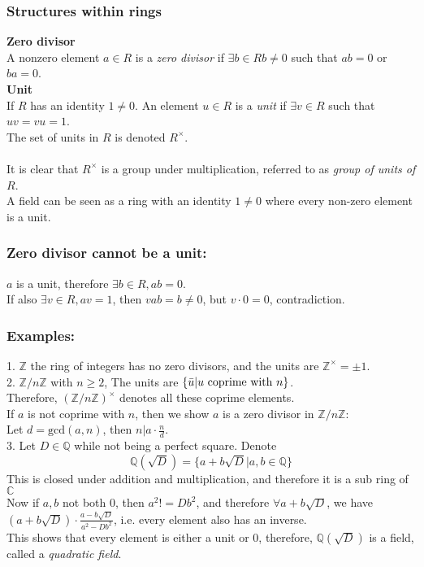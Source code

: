 \documentclass{article}
\begin{document}
\subsubsection{Structures within rings}
\textbf{Zero divisor}\\
A nonzero element $a \in R$ is a \textit{zero divisor} if $\exists b \in R b \neq 0$ such that $ab=0$ or $ba=0$.\\
\textbf{Unit}\\
If $R$ has an identity $1\neq 0$. An element $u \in R$ is a \textit{unit} if $\exists v \in R$ such that $uv = vu = 1$.\\
The set of units in $R$ is denoted $R^\times$.\\\\
It is clear that $R^\times$ is a group under multiplication, referred to as \textit{group of units of $R$}.\\
A field can be seen as a ring with an identity $1 \neq 0$ where every non-zero element is a unit.
\subsubsection{Zero divisor cannot be a unit:}
$a$ is a unit, therefore $\exists b \in R, ab=0$.\\
If also $\exists v \in R, av = 1$, then $vab = b \neq 0$, but $v\cdot 0 = 0$, contradiction.
\subsubsection{Examples:}
1. $\mathbb{Z}$ the ring of integers has no zero divisors, and the units are $\mathbb{Z}^\times = \pm 1$.\\
2. $\mathbb{Z}/n\mathbb{Z}$ with $n \geq 2$, The units are $\{\Bar{u}|u\textrm{ coprime with } n\}$.\\
Therefore, $(\mathbb{Z}/n\mathbb{Z})^\times$ denotes all these coprime elements.\\
If $a$ is not coprime with $n$, then we show $a$ is a zero divisor in $\mathbb{Z}/n\mathbb{Z}$:\\
Let $d = \textrm{gcd}(a, n)$, then $n | a \cdot \frac{n}{d}$.\\
3. Let $D \in \mathbb{Q}$ while not being a perfect square. Denote
\begin{equation*}
    \mathbb{Q}(\sqrt{D}) = \{a+b\sqrt{D}|a,b \in \mathbb{Q}\}
\end{equation*}
This is closed under addition and multiplication, and therefore it is a sub ring of $\mathbb{C}$\\
Now if $a,b$ not both $0$, then $a^2 != Db^2$, and therefore $\forall a+b\sqrt{D}$, we have $(a+b\sqrt{D})\cdot \frac{a-b\sqrt{D}}{a^2-Db^2}$, i.e. every element also has an inverse.\\
This shows that every element is either a unit or $0$, therefore, $\mathbb{Q}(\sqrt{D})$ is a field, called a \textit{quadratic field}.
\end{document}
